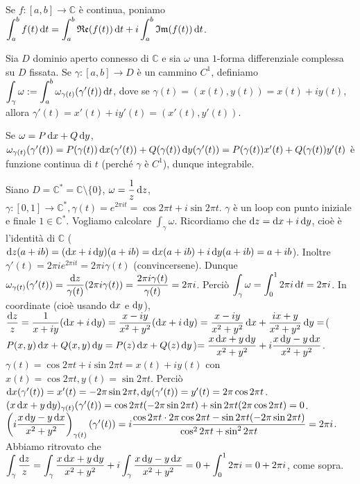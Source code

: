 Se $f:[a, b] \longrightarrow \mathbb{C}$ è continua, poniamo $\displaystyle \int_a^b f(t)\mathop{}\!\mathrm{d} t=\int_a^b \mathfrak{Re}(f(t))\mathop{}\!\mathrm{d} t+i\int_a^b \mathfrak{Im}(f(t))\mathop{}\!\mathrm{d} t$.

\begin{defn}
  Sia $D$ dominio aperto connesso di $\mathbb{C}$ e sia $\omega$ una $1$-forma differenziale complessa su $D$ fissata. Se $\gamma:[a, b] \longrightarrow D$ è un cammino $C^1$, definiamo $\displaystyle \int_{\gamma} \omega:=\int_a^b \omega_{\gamma(t)}(\gamma'(t))\mathop{}\!\mathrm{d} t$, dove se $\gamma(t)=(x(t), y(t))=x(t)+iy(t)$, allora $\gamma'(t)=x'(t)+iy'(t)=(x'(t), y'(t))$.
\end{defn}

\begin{oss}
  Se $\omega=P\mathop{}\!\mathrm{d} x+Q\mathop{}\!\mathrm{d} y$, $\omega_{\gamma(t)}(\gamma'(t))=P(\gamma(t))\mathop{}\!\mathrm{d} x(\gamma'(t))+Q(\gamma(t))\mathop{}\!\mathrm{d} y(\gamma'(t))=P(\gamma(t))x'(t)+Q(\gamma(t))y'(t)$ è funzione continua di $t$ (perché $\gamma$ è $C^1$), dunque integrabile.
\end{oss}

\begin{ex}
  Siano $D=\mathbb{C}^*=\mathbb{C}\setminus\{0\}$, $\omega=\dfrac{1}{z}\mathop{}\!\mathrm{d} z$, $\gamma:[0, 1] \longrightarrow \mathbb{C}^*, \gamma(t)=e^{2\pi i t}=\cos{2\pi t}+i\sin{2\pi t}$.
  $\gamma$ è un loop con punto iniziale e finale $1 \in \mathbb{C}^*$. Vogliamo calcolare $\displaystyle \int_{\gamma} \omega$. Ricordiamo che $\mathop{}\!\mathrm{d} z=\mathop{}\!\mathrm{d} x+i\mathop{}\!\mathrm{d} y$, cioè è l'identità di $\mathbb{C}$ ($\mathop{}\!\mathrm{d} z(a+ib)=(\mathop{}\!\mathrm{d} x+i\mathop{}\!\mathrm{d} y)(a+ib)=\mathop{}\!\mathrm{d} x(a+ib)+i\mathop{}\!\mathrm{d} y(a+ib)=a+ib$). Inoltre $\gamma'(t)=2\pi ie^{2\pi it}=2\pi i\gamma(t)$ (convincersene).
  Dunque $\omega_{\gamma(t)}(\gamma'(t))=\dfrac{\mathop{}\!\mathrm{d} z}{\gamma(t)}(2\pi i\gamma(t))=\dfrac{2\pi i \gamma(t)}{\gamma(t)}=2\pi i$. Perciò $\displaystyle \int_{\gamma} \omega=\int_0^1 2\pi i \mathop{}\!\mathrm{d} t=2\pi i$.
  In coordinate (cioè usando $\mathop{}\!\mathrm{d} x$ e $\mathop{}\!\mathrm{d} y$), $\dfrac{\mathop{}\!\mathrm{d} z}{z}=\dfrac{1}{x+iy}(\mathop{}\!\mathrm{d} x+i\mathop{}\!\mathrm{d} y)=\dfrac{x-iy}{x^2+y^2}(\mathop{}\!\mathrm{d} x+i\mathop{}\!\mathrm{d} y)=\dfrac{x-iy}{x^2+y^2}\mathop{}\!\mathrm{d} x+\dfrac{ix+y}{x^2+y^2}\mathop{}\!\mathrm{d} y=$($P(x, y) \mathop{}\!\mathrm{d} x+Q(x, y)\mathop{}\!\mathrm{d} y=P(z) \mathop{}\!\mathrm{d} x+Q(z)\mathop{}\!\mathrm{d} y$)$=\dfrac{x\mathop{}\!\mathrm{d} x+y\mathop{}\!\mathrm{d} y}{x^2+y^2}+i\dfrac{x\mathop{}\!\mathrm{d} y-y \mathop{}\!\mathrm{d} x}{x^2+y^2}$.
  $\gamma(t)=\cos{2\pi t}+i\sin{2\pi t}=x(t)+iy(t)$ con $x(t)=\cos{2\pi t}, y(t)=\sin{2\pi t}$. Perciò $\mathop{}\!\mathrm{d} x(\gamma'(t))=x'(t)=-2\pi\sin{2\pi t}, \mathop{}\!\mathrm{d} y(\gamma'(t))=y'(t)=2\pi\cos{2\pi t}$.
  $(x\mathop{}\!\mathrm{d} x+y\mathop{}\!\mathrm{d} y)_{\gamma(t)}(\gamma'(t))=\cos{2\pi t}(-2\pi\sin{2\pi t})+\sin{2\pi t}(2\pi\cos{2\pi t})=0$. \\
  $\left(i\dfrac{x\mathop{}\!\mathrm{d} y-y\mathop{}\!\mathrm{d} x}{x^2+y^2}\right)_{\gamma(t)}(\gamma'(t))=i\dfrac{\cos{2\pi t}\cdot2\pi\cos{2\pi t}-\sin{2\pi t}(-2\pi\sin{2\pi t})}{\cos^2{2\pi t}+\sin^2{2\pi t}}=2\pi i$.
  Abbiamo ritrovato che $\displaystyle \int_{\gamma} \dfrac{\mathop{}\!\mathrm{d} z}{z}=\int_{\gamma} \dfrac{x\mathop{}\!\mathrm{d} x+y\mathop{}\!\mathrm{d} y}{x^2+y^2}+i\int_{\gamma} \dfrac{x\mathop{}\!\mathrm{d} y-y\mathop{}\!\mathrm{d} x}{x^2+y^2}=0+\int_0^1 2\pi i=0+2\pi i$, come sopra.
\end{ex}

